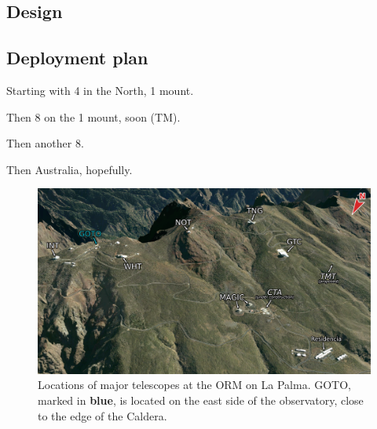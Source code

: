\begin{colsection}

\subsection{Design}
\label{sec:goto_design}
\begin{colsection}


\end{colsection}


\newpage
\subsection{Deployment plan}
\label{sec:goto_expansion}
\begin{colsection}

Starting with 4 in the North, 1 mount.

Then 8 on the 1 mount, soon (TM).

Then another 8.

Then Australia, hopefully.

\newpage

\begin{figure}[p]
    \begin{center}
        \includegraphics[width=\linewidth]{images/orm_labelled.png}
    \end{center}
    \caption[Locations of major telescopes on La Palma]{
        Locations of major telescopes at the ORM on La Palma. GOTO, marked in \textcolor{BlueGreen}{\textbf{blue}}, is located on the east side of the observatory, close to the edge of the Caldera.
    }\label{fig:orm}
\end{figure}


\end{colsection}
\end{colsection}
